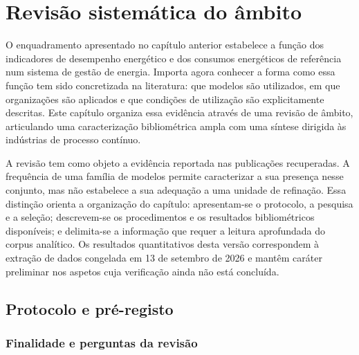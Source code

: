 
\chapter{Revisão sistemática do âmbito}
\label{cha:revisao}

O enquadramento apresentado no capítulo anterior estabelece a função dos
indicadores de desempenho energético e dos consumos energéticos de referência
num sistema de gestão de energia. Importa agora conhecer a forma como essa
função tem sido concretizada na literatura: que modelos são utilizados,
em que organizações são aplicados e que condições de utilização são
explicitamente descritas. Este capítulo organiza essa evidência através de
uma revisão de âmbito, articulando uma caracterização bibliométrica ampla
com uma síntese dirigida às indústrias de processo contínuo.

A revisão tem como objeto a evidência reportada nas publicações recuperadas.
A frequência de uma família de modelos permite caracterizar a sua presença
nesse conjunto, mas não estabelece a sua adequação a uma unidade de refinação.
Essa distinção orienta a organização do capítulo: apresentam-se o protocolo,
a pesquisa e a seleção; descrevem-se os procedimentos e os resultados
bibliométricos disponíveis; e delimita-se a informação que requer a leitura
aprofundada do corpus analítico. Os resultados quantitativos desta versão
correspondem à extração de dados congelada em 13 de setembro de 2026 e
mantêm caráter preliminar nos aspetos cuja verificação ainda não está concluída.

\section{Protocolo e pré-registo}
\label{sec:protocolo-sr}

\subsection{Finalidade e perguntas da revisão}

